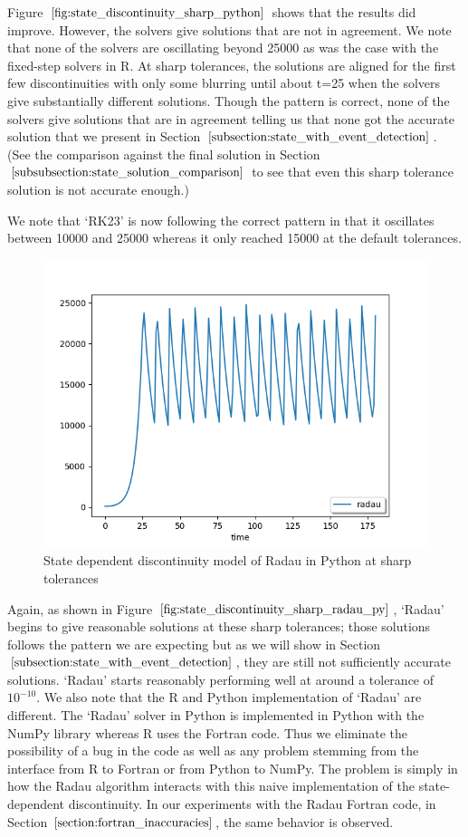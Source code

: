 Figure $\ref{fig:state_discontinuity_sharp_python}$ shows that the results did improve. However, the solvers give solutions that are not in agreement. We note that none of the solvers are oscillating beyond 25000 as was the case with the fixed-step solvers in R. At sharp tolerances, the solutions are aligned for the first few discontinuities with only some blurring until about t=25 when the solvers give substantially different solutions. Though the pattern is correct, none of the solvers give solutions that are in agreement telling us that none got the accurate solution that we present in Section $\ref{subsection:state_with_event_detection}$. (See the comparison against the final solution in Section $\ref{subsubsection:state_solution_comparison}$ to see that even this sharp tolerance solution is not accurate enough.)

We note that `RK23' is now following the correct pattern in that it oscillates between 10000 and 25000 whereas it only reached 15000 at the default tolerances. 

\begin{figure}[H]
\centering
\includegraphics[width=0.7\linewidth]{./figures/state_discontinuity_sharp_radau_py}
\caption{State dependent discontinuity model of Radau in Python at sharp tolerances}
\label{fig:state_discontinuity_sharp_radau_py}
\end{figure}

Again, as shown in Figure $\ref{fig:state_discontinuity_sharp_radau_py}$, `Radau' begins to give reasonable solutions at these sharp tolerances; those solutions follows the pattern we are expecting but as we will show in Section $\ref{subsection:state_with_event_detection}$, they are still not sufficiently accurate solutions. `Radau' starts reasonably performing well at around a tolerance of $10^{-10}$. We also note that the R and Python implementation of `Radau' are different. The `Radau' solver in Python is implemented in Python with the NumPy library whereas R uses the Fortran code. Thus we eliminate the possibility of a bug in the code as well as any problem stemming from the interface from R to Fortran or from Python to NumPy. The problem is simply in how the Radau algorithm interacts with this naive implementation of the state-dependent discontinuity. In our experiments with the Radau Fortran code, in Section $\ref{section:fortran_inaccuracies}$, the same behavior is observed.

